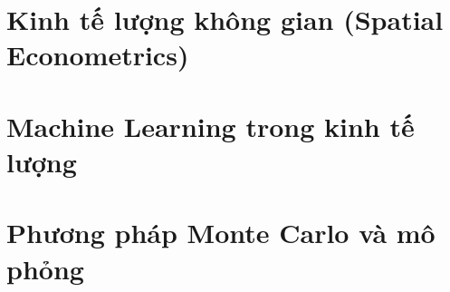 \documentclass[openany]{book}
\begin{document}
\part{Kinh tế lượng không gian (Spatial Econometrics)}




\part{Machine Learning trong kinh tế lượng}







\part{Phương pháp Monte Carlo và mô phỏng}





\appendix




\end{document}
